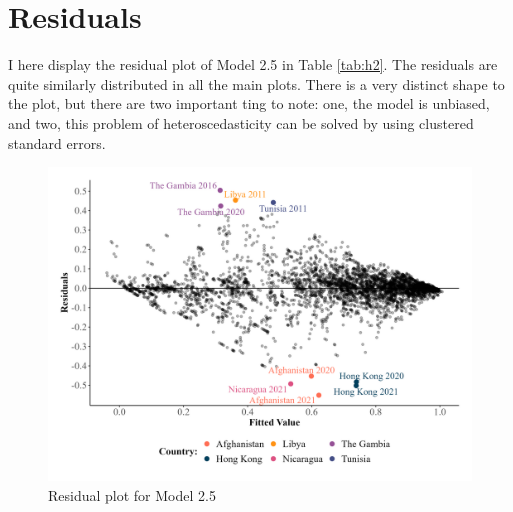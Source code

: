 \newpage

\section{Residuals}
I here display the residual plot of Model 2.5 in Table \ref{tab:h2}. The residuals are quite similarly distributed in all the main plots. There is a very distinct shape to the plot, but there are two important ting to note: one, the model is unbiased, and two, this problem of heteroscedasticity can be solved by using clustered standard errors.

\begin{figure}[H]
    \centering
    \includegraphics[width=\linewidth]{graphics/residuals.jpeg}
    \caption{Residual plot for Model 2.5}
    \label{fig:residuals}
\end{figure}